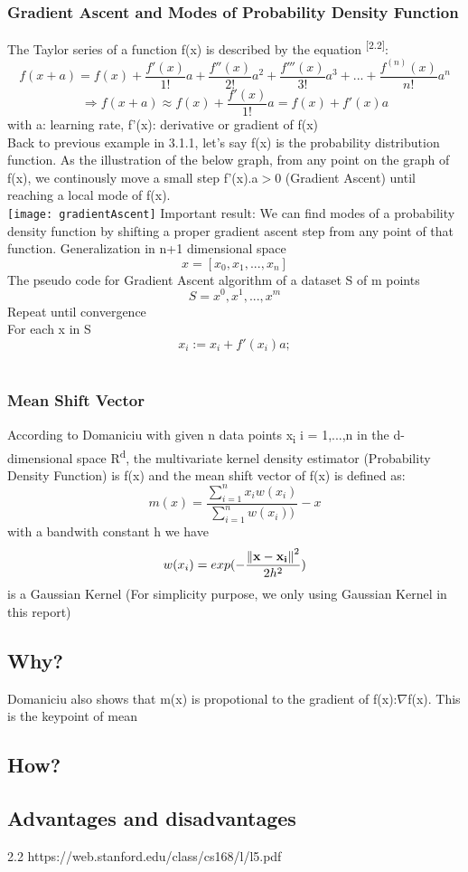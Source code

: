 \subsubsection{Gradient Ascent and Modes of Probability Density Function}
The Taylor series of a function f(x) is described by the equation \textsuperscript{[2.2]}:
\[
    f(x+a) = f(x) + \frac{f'(x)}{1!}a+\frac{f''(x)}{2!}a^2+\frac{f'''(x)}{3!}a^3+...+\frac{f^{(n)}(x)}{n!}a^n
\]
\[\Longrightarrow f(x+a) \approx f(x) + \frac{f'(x)}{1!}a =  f(x) + f'(x)a\]
with a: learning rate,  f'(x): derivative or gradient of f(x)\\
Back to previous example in 3.1.1, let's say f(x) is the probability distribution function. As the illustration of the below graph, from any point on the graph of f(x), we continously move a small step f'(x).a$>$0 (Gradient Ascent) until reaching a local mode of f(x).\\ 
\texttt{[image: gradientAscent]}
Important result: We can find modes of a probability density function by shifting a proper gradient ascent step from any point of that function. Generalization in n+1 dimensional space \[x=[x_0,x_1,...,x_n]\]
The pseudo code for Gradient Ascent algorithm of a dataset S of m points \[S = {x^0,x^1,...,x^m}\]
Repeat until convergence \textbraceleft\\ 
\hspace{5cm}For each x in S \textbraceleft
\[x_i := x_i + f'(x_i)a;\]
\textbraceright\\
\textbraceright
\subsubsection{Mean Shift Vector}

According to Domaniciu with given n data points x\textsubscript{i} i = 1,...,n in the d-dimensional space R\textsuperscript{d}, the multivariate kernel density estimator (Probability Density Function) is f(x) and the mean shift vector of f(x) is defined as:
	\[m(x) = \frac{\sum_{i=1}^{n}x_i{w(x_i) }}{\sum_{i=1}^{n}{w(x_i) }) }-x\]
with a bandwith constant h we have \[w(x_i) = exp(-\frac{\norm{\vb{{x-x_i}}}^2}{2{h}^2})\] is a Gaussian Kernel (For simplicity purpose, we only using Gaussian Kernel in this report)
\subsection{Why?}
Domaniciu also shows that m(x) is propotional to the gradient of f(x):$\nabla$f(x). This is the keypoint of mean
\subsection{How?}

\subsection{Advantages and disadvantages}

2.2 https://web.stanford.edu/class/cs168/l/l5.pdf
